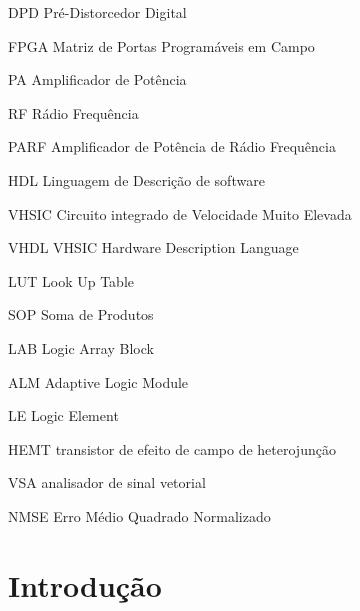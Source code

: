 \documentclass[
	12pt,				%
	openright,			%
	oneside,			%
	a4paper,			%
	brazil				%
	]{abntex2}
\begin{document}
\renewcommand{\resumoname}{Abstract} %
\begin{resumo}
    
\end{resumo}
\renewcommand{\resumoname}{Resumo}
\begin{siglas}  %
 \item[DPD]  Pré-Distorcedor Digital
 \item[FPGA] Matriz de Portas Programáveis em Campo 
 \item[PA] Amplificador de Potência
 \item[RF] Rádio Frequência 
 \item[PARF] Amplificador de Potência de Rádio Frequência 
 \item[HDL] Linguagem de Descrição de software
 \item[VHSIC]  Circuito integrado de Velocidade Muito Elevada 
 \item[VHDL]  VHSIC Hardware Description Language
 \item[LUT]  Look Up Table
 \item[SOP]  Soma de Produtos 
 \item[LAB]  Logic Array Block 
 \item[ALM]  Adaptive Logic Module
 \item[LE]   Logic Element 
 \item[HEMT] transistor de efeito de campo de heterojunção
 \item[VSA] analisador de sinal vetorial  
 \item[NMSE] Erro Médio Quadrado Normalizado
\end{siglas}




	
\listoffigures*
\cleardoublepage{\tiny }
\listoftables*
\cleardoublepage
\tableofcontents*
\cleardoublepage



\textual


\chapter{Introdução} 
\label{chap:introducao}

\end{document}
